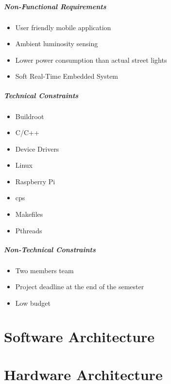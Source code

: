 \subparagraph{Non-Functional Requirements}
\begin{itemize}
	\item User friendly mobile application
	\item Ambient luminosity sensing
	\item Lower power consumption than actual street lights
	\item Soft Real-Time Embedded System
\end{itemize}

\subparagraph{Technical Constraints}
\begin{itemize}
	\item Buildroot
	\item C/C++ 
	\item Device Drivers
	\item Linux
	\item Raspberry Pi
	\item \ac{cps}
	\item Makefiles
	\item Pthreads
\end{itemize}

\subparagraph{Non-Technical Constraints}
\begin{itemize}
	\item Two members team
	\item Project deadline at the end of the semester
	\item Low budget
	
\end{itemize}

\section{Software Architecture}

\section{Hardware Architecture}
